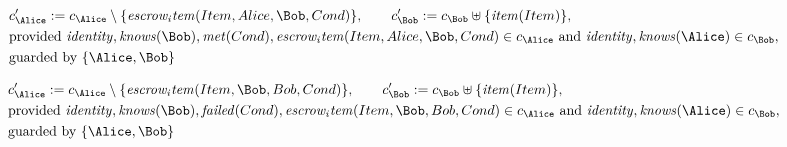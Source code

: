 \begin{align*}
&
c'_
{
\Alice
}
 := 
c_
{
\Alice
}
 \setminus 
\{
\mathit{
escrow_item
}
(
Item
,
Alice
,
\Bob
,
Cond
)
\}
, \qquad 
c'_
{
\Bob
}
 := 
c_
{
\Bob
}
 \uplus 
\{
\mathit{
item
}
(
Item
)
\}
,\\
&
\text{provided } 
\mathit{
identity
}
,
\mathit{
knows
}
(
\Bob
)
,
\mathit{
met
}
(
Cond
)
,
\mathit{
escrow_item
}
(
Item
,
Alice
,
\Bob
,
Cond
)
 \in c_
{
\Alice
}
 \text{ and } 
\mathit{
identity
}
,
\mathit{
knows
}
(
\Alice
)
 \in c_
{
\Bob
}
,\\
&
\text{guarded by } \{
\Alice
,
\Bob
\}
\end{align*}

\begin{align*}
&
c'_
{
\Alice
}
 := 
c_
{
\Alice
}
 \setminus 
\{
\mathit{
escrow_item
}
(
Item
,
\Bob
,
Bob
,
Cond
)
\}
, \qquad 
c'_
{
\Bob
}
 := 
c_
{
\Bob
}
 \uplus 
\{
\mathit{
item
}
(
Item
)
\}
,\\
&
\text{provided } 
\mathit{
identity
}
,
\mathit{
knows
}
(
\Bob
)
,
\mathit{
failed
}
(
Cond
)
,
\mathit{
escrow_item
}
(
Item
,
\Bob
,
Bob
,
Cond
)
 \in c_
{
\Alice
}
 \text{ and } 
\mathit{
identity
}
,
\mathit{
knows
}
(
\Alice
)
 \in c_
{
\Bob
}
,\\
&
\text{guarded by } \{
\Alice
,
\Bob
\}
\end{align*}
